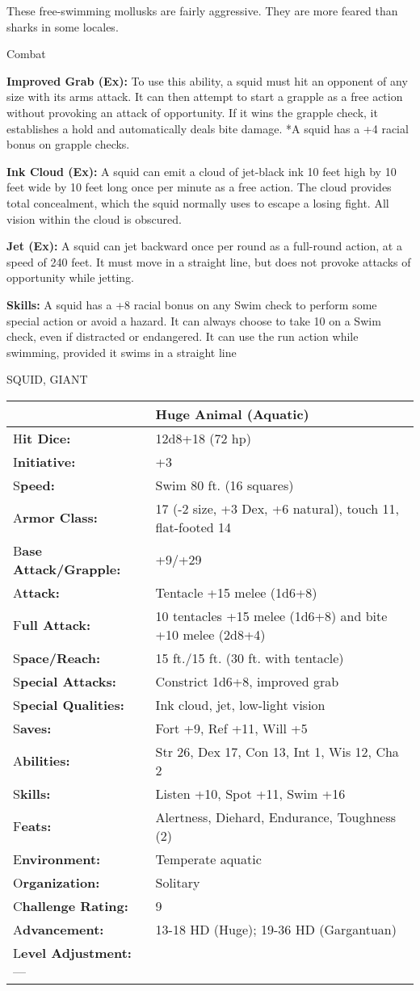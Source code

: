 \documentclass{article}
\begin{document}
These free-swimming mollusks are fairly aggressive. They are more feared than sharks 
in some locales.

Combat

\textbf{Improved Grab (Ex): }To use this ability, a squid must hit an opponent 
of any size with its arms attack. It can then attempt to start a grapple as a free 
action without provoking an attack of opportunity. If it wins the grapple check, 
it establishes a hold and automatically deals bite damage. *A squid has a +4 racial 
bonus on grapple checks.

\textbf{Ink Cloud (Ex):} A squid can emit a cloud of jet-black ink 10 feet high 
by 10 feet wide by 10 feet long once per minute as a free action. The cloud provides 
total concealment, which the squid normally uses to escape a losing fight. All 
vision within the cloud is obscured. 

\textbf{Jet (Ex):} A squid can jet backward once per round as a full-round action, 
at a speed of 240 feet. It must move in a straight line, but does not provoke attacks 
of opportunity while jetting.

\textbf{Skills:} A squid has a +8 racial bonus on any Swim check to perform some 
special action or avoid a hazard. It can always choose to take 10 on a Swim check, 
even if distracted or endangered. It can use the run action while swimming, provided 
it swims in a straight line

\vspace{12pt}
SQUID, GIANT

\begin{tabular}{|>{\raggedright}p{90pt}|>{\raggedright}p{235pt}|}
\hline
  & Huge Animal (Aquatic)\tabularnewline
\hline
H\textbf{it Dice:} & 12d8+18 (72 hp)\tabularnewline
\hline
I\textbf{nitiative:} & +3\tabularnewline
\hline
S\textbf{peed:} & Swim 80 ft. (16 squares)\tabularnewline
\hline
A\textbf{rmor Class:} & 17 (-2 size, +3 Dex, +6 natural), touch 11, flat-footed 
14\tabularnewline
\hline
B\textbf{ase Attack/Grapple:} & +9/+29\tabularnewline
\hline
A\textbf{ttack:} & Tentacle +15 melee (1d6+8)\tabularnewline
\hline
F\textbf{ull Attack:} & 10 tentacles +15 melee (1d6+8) and bite +10 melee (2d8+4)\tabularnewline
\hline
S\textbf{pace/Reach:} & 15 ft./15 ft. (30 ft. with tentacle)\tabularnewline
\hline
S\textbf{pecial Attacks:} & Constrict 1d6+8, improved grab\tabularnewline
\hline
S\textbf{pecial Qualities:} & Ink cloud, jet, low-light vision\tabularnewline
\hline
S\textbf{aves:} & Fort +9, Ref +11, Will +5\tabularnewline
\hline
A\textbf{bilities:} & Str 26, Dex 17, Con 13, Int 1, Wis 12, Cha 2\tabularnewline
\hline
S\textbf{kills:} & Listen +10, Spot +11, Swim +16\tabularnewline
\hline
F\textbf{eats:} & Alertness, Diehard, Endurance, Toughness (2)\tabularnewline
\hline
E\textbf{nvironment:} & Temperate aquatic\tabularnewline
\hline
O\textbf{rganization:} & Solitary\tabularnewline
\hline
C\textbf{hallenge Rating:} & 9\tabularnewline
\hline
A\textbf{dvancement:} & 13-18 HD (Huge); 19-36 HD (Gargantuan)\tabularnewline
\hline
L\textbf{evel Adjustment:}--- & \tabularnewline
\hline
\end{tabular}
\end{document}
